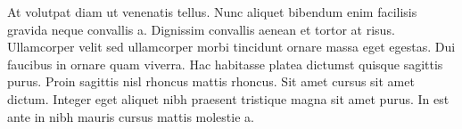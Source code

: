 At volutpat diam ut venenatis tellus. Nunc aliquet bibendum enim facilisis gravida neque convallis a. Dignissim convallis aenean et tortor at risus. Ullamcorper velit sed ullamcorper morbi tincidunt ornare massa eget egestas. Dui faucibus in ornare quam viverra. Hac habitasse platea dictumst quisque sagittis purus. Proin sagittis nisl rhoncus mattis rhoncus. Sit amet cursus sit amet dictum. Integer eget aliquet nibh praesent tristique magna sit amet purus. In est ante in nibh mauris cursus mattis molestie a.